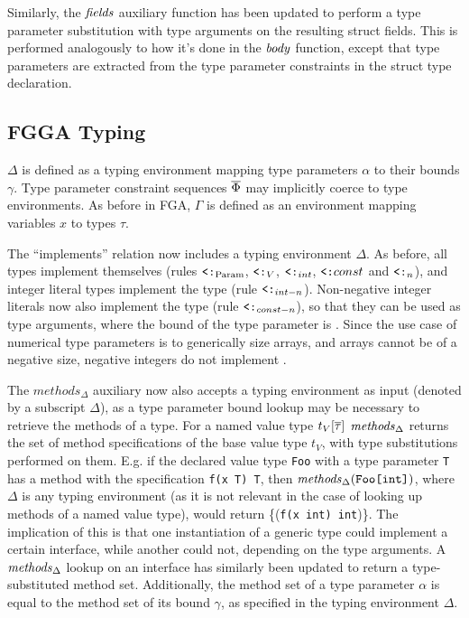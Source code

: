 Similarly, the $\mathit{fields}$ auxiliary function has been updated to perform a type
parameter substitution with type arguments on the resulting struct fields. This
is performed analogously to how it's done in the $\mathit{body}$ function, except that
type parameters are extracted from the type parameter constraints in the struct
type declaration.



\subsection{FGGA Typing}

$\Delta$ is defined as a typing environment mapping type parameters $\alpha$
to their bounds $\gamma$. Type parameter constraint sequences $\overline{\Phi}$ may
implicitly coerce to type environments. As before in FGA, $\Gamma$ is defined as
an environment mapping variables $x$ to types $\tau$.

The ``implements'' relation now includes a typing environment $\Delta$. As
before, all types implement themselves (rules $\mathbin{\texttt{<:}}_{\text{Param}}$, $\mathbin{\texttt{<:}}_V$,
$\mathbin{\texttt{<:}}_{int}$, $\mathbin{\texttt{<:}}{const}$ and $\mathbin{\texttt{<:}}_n$), and integer literal types implement
the  type (rule $\mathbin{\texttt{<:}}_{int-n}$). Non-negative integer literals now also
implement the  type (rule $\mathbin{\texttt{<:}}_{const-n}$), so that they can be used
as type arguments, where the bound of the type parameter is . Since
the use case of numerical type parameters is to generically size arrays, and
arrays cannot be of a negative size, negative integers do not implement
.


The $methods_\Delta$ auxiliary now also accepts a typing environment as input
(denoted by a subscript $\Delta$), as a type parameter bound lookup may be
necessary to retrieve the methods of a type. For a named value type
$t_V[\overline{\tau}]$ $\mathit{methods}_\Delta$ returns the set of method specifications of
the base value type $t_V$, with type substitutions performed on them. E.g. if
the declared value type \texttt{Foo} with a type parameter \texttt{T} has a
method with the specification \texttt{f(x T) T}, then
$\mathit{methods}_\Delta(\texttt{Foo[int]})$, where $\Delta$ is any typing environment
(as it is not relevant in the case of looking up methods of a named value type),
would return \{(\texttt{f(x int) int})\}. The implication of this is that one
instantiation of a generic type could implement a certain interface, while
another could not, depending on the type arguments. A $\mathit{methods}_\Delta$ lookup
on an interface has similarly been updated to return a type-substituted method
set. Additionally, the method set of a type parameter $\alpha$ is equal to the
method set of its bound $\gamma$, as specified in the typing environment
$\Delta$.

